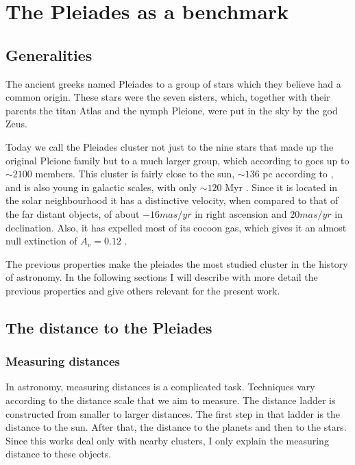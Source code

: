 \chapter{The Pleiades as a benchmark}
\label{chap:pleiades}

\section{Generalities}
The ancient greeks named Pleiades to a group of stars which they believe had a common origin. These stars were the seven sisters, which, together with their parents the titan Atlas and the nymph Pleione, were put in the sky  by the god Zeus.
 
Today we call the Pleiades cluster not just to the nine stars that made up the original Pleione family but to a much larger group, which according to \citet{Bouy2015} goes up to $\sim2100$ members. This cluster is fairly close to the sun, $\sim 136$ pc according to \citet{Galli2017}, and is also young in galactic scales, with only $\sim120$ Myr \citep{Stauffer1998}. Since it is located in the solar neighbourhood it has a distinctive velocity, when compared to that of the far distant objects, of about $-16 mas/yr$ in right ascension and $20 mas/yr$ in declination. Also, it has expelled most of its cocoon gas, which gives it an almost null extinction of $A_v=0.12$ \citep{Guthrie1987}. 

The previous properties make the pleiades the most studied cluster in the history of astronomy. In the following sections I will describe with more detail the previous properties and give others relevant for the present work.

\section{The distance to the Pleiades}

\subsection{Measuring distances}
In astronomy, measuring distances is a complicated task. Techniques vary according to the distance scale that we aim to measure. The distance ladder is constructed from smaller to larger distances. The first step in that ladder is the distance to the sun. After that, the distance to the planets and then to the stars. Since this works deal only with nearby clusters, I only explain the measuring distance to these objects. 

